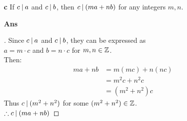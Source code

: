 \documentclass[paper=usletter, fontsize=12pt]{article}
\begin{document}
\begin{itemize}
\begin{itemize}
\begin{itemize}
                    \item[\textbf{c}] If $c \:\vert\: a$ and $c \:\vert\: b$, then $c
                    \:\vert\: (ma + nb)$ for any integers $m, n$.
                    \item[\textbf{Ans}]
                    \begin{proof}[\unskip\nopunct]
                        Since $c \:\vert\: a$ and $c \:\vert\: b$, they can be
                        expressed as \\ $a = m \cdot c$ and $b = n \cdot c$ for
                        $m, n \in \mathbb{Z}$. \\
                        Then:
                        \begin{align*}
                            ma + nb & = m(mc) + n(nc) \\
                            & = m^2c + n^2c \\
                            & = (m^2 + n^2)c
                        \end{align*}
                        Thus $c \:\vert\: (m^2 + n^2)$ for some $(m^2 + n^2)
                        \in \mathbb{Z}$. \\
                        $\therefore c \:\vert\: (ma + nb)$ \qedhere
                    \end{proof}
                    \vspace{0.2in}

                \end{itemize}


\end{itemize}
\end{itemize}
\end{document}
